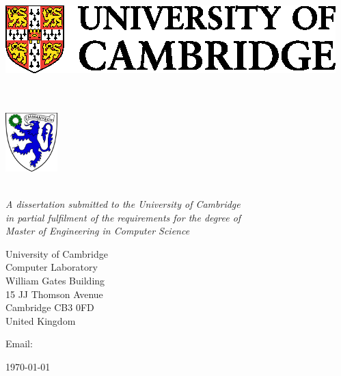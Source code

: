 \begin{titlepage} 

\begin{center}
\includegraphics{CUni3.eps}\\[48pt]
\noindent
\huge
\bfseries
\dissertationtitle \\[36pt]

\end{center}

\begin{center}
\noindent
\huge
\authorname \\[15pt]
\Large
\includegraphics[width=20mm,scale=0.2]{Emmanuel_College_Crest.eps}\\ 
\authorcollege      \\[28pt]
\end{center}

\vspace{24pt} 

\begin{center}
\noindent
\large
{\it A dissertation submitted to the University of Cambridge \\ 
in partial fulfilment of the requirements for the degree of \\ 
Master of Engineering in Computer Science} 
\end{center}

\begin{center}
\noindent
University of Cambridge \\
Computer Laboratory     \\
William Gates Building  \\
15 JJ Thomson Avenue    \\
Cambridge CB3 0FD       \\
{\sc United Kingdom}    \\
\end{center}

\begin{center}
\noindent
Email: \authoremail \\
\end{center}

\begin{center}
\noindent
\today
\end{center}

\end{titlepage} 

\newpage
\vspace*{\fill}
